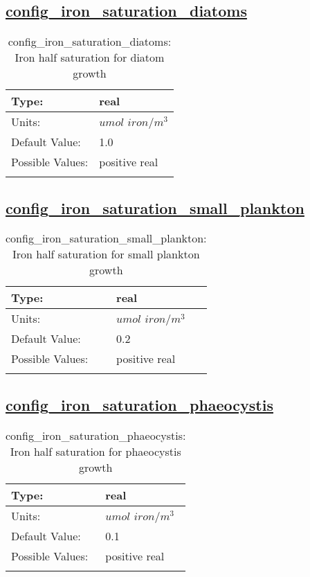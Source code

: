 \subsection[config\_iron\_saturation\_diatoms]{\hyperref[sec:nm_tab_biogeochemistry]{config\_iron\_saturation\_diatoms}}
\label{subsec:nm_sec_config_iron_saturation_diatoms}
\begin{center}
\begin{longtable}{| p{2.0in} || p{4.0in} |}
    \hline
    Type: & real \\
    \hline
    Units: & $umol$ $iron/m^3$ \\
    \hline
    Default Value: & 1.0 \\
    \hline
    Possible Values: & positive real \\
    \hline
    \caption{config\_iron\_saturation\_diatoms: Iron half saturation for diatom growth}
\end{longtable}
\end{center}
\subsection[config\_iron\_saturation\_small\_plankton]{\hyperref[sec:nm_tab_biogeochemistry]{config\_iron\_saturation\_small\_plankton}}
\label{subsec:nm_sec_config_iron_saturation_small_plankton}
\begin{center}
\begin{longtable}{| p{2.0in} || p{4.0in} |}
    \hline
    Type: & real \\
    \hline
    Units: & $umol$ $iron/m^3$ \\
    \hline
    Default Value: & 0.2 \\
    \hline
    Possible Values: & positive real \\
    \hline
    \caption{config\_iron\_saturation\_small\_plankton: Iron half saturation for small plankton growth}
\end{longtable}
\end{center}
\subsection[config\_iron\_saturation\_phaeocystis]{\hyperref[sec:nm_tab_biogeochemistry]{config\_iron\_saturation\_phaeocystis}}
\label{subsec:nm_sec_config_iron_saturation_phaeocystis}
\begin{center}
\begin{longtable}{| p{2.0in} || p{4.0in} |}
    \hline
    Type: & real \\
    \hline
    Units: & $umol$ $iron/m^3$ \\
    \hline
    Default Value: & 0.1 \\
    \hline
    Possible Values: & positive real \\
    \hline
    \caption{config\_iron\_saturation\_phaeocystis: Iron half saturation for phaeocystis growth}
\end{longtable}
\end{center}
